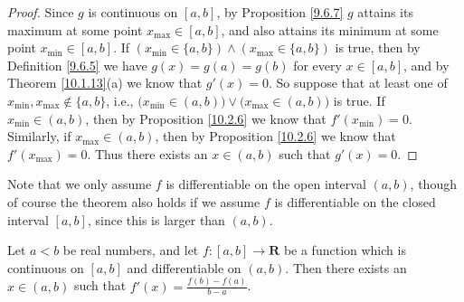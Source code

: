 \begin{proof}
    Since \(g\) is continuous on \([a, b]\), by Proposition \ref{9.6.7} \(g\) attains its maximum at some point \(x_{\max} \in [a, b]\), and also attains its minimum at some point \(x_{\min} \in [a, b]\).
    If \((x_{\min} \in \{a, b\}) \land (x_{\max} \in \{a, b\})\) is true, then by Definition \ref{9.6.5} we have \(g(x) = g(a) = g(b)\) for every \(x \in [a, b]\), and by Theorem \ref{10.1.13}(a) we know that \(g'(x) = 0\).
    So suppose that at least one of \(x_{\min}, x_{\max} \notin \{a, b\}\), i.e., \(\big(x_{\min} \in (a, b)\big) \lor \big(x_{\max} \in (a, b)\big)\) is true.
    If \(x_{\min} \in (a, b)\), then by Proposition \ref{10.2.6} we know that \(f'(x_{\min}) = 0\).
    Similarly, if \(x_{\max} \in (a, b)\), then by Proposition \ref{10.2.6} we know that \(f'(x_{\max}) = 0\).
    Thus there exists an \(x \in (a, b)\) such that \(g'(x) = 0\).
\end{proof}

\begin{remark}\label{10.2.8}
    Note that we only assume \(f\) is differentiable on the open interval \((a, b)\), though of course the theorem also holds if we assume \(f\) is differentiable on the closed interval \([a, b]\), since this is larger than \((a, b)\).
\end{remark}

\begin{corollary}\label{10.2.9}
    Let \(a < b\) be real numbers, and let \(f : [a, b] \to \mathbf{R}\) be a function which is continuous on \([a, b]\) and differentiable on \((a, b)\).
    Then there exists an \(x \in (a, b)\) such that \(f'(x) = \frac{f(b) - f(a)}{b - a}\).
\end{corollary}

